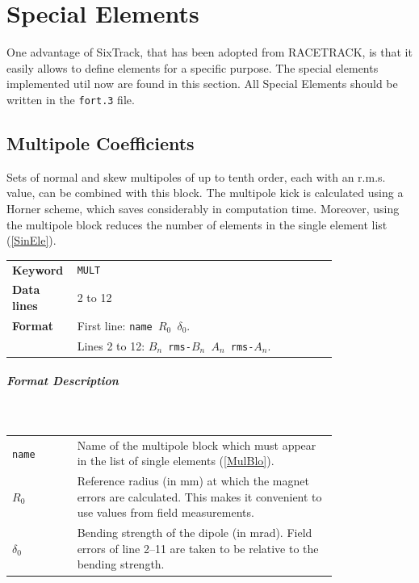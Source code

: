 
\chapter{Special Elements} \label{SpecElem}

One advantage of SixTrack, that has been adopted from RACETRACK, is that it easily allows to define elements for a specific purpose.
The special elements implemented util now are found in this section.
All Special Elements should be written in the \texttt{fort.3} file.

\section{Multipole Coefficients} \label{MulCoe}

Sets of normal and skew multipoles of up to tenth order, each with an r.m.s. value, can be combined with this block.
The multipole kick is calculated using a Horner scheme, which saves considerably in computation time.
Moreover, using the multipole block reduces the number of elements in the single element list (\ref{SinEle}).

\bigskip
\begin{tabular}{@{}lp{0.8\linewidth}}
    \textbf{Keyword}    & \texttt{MULT} \\
    \textbf{Data lines} & 2 to 12 \\
    \textbf{Format}     & First line: \texttt{name $R_{0}$ $\delta_{0}$}. \\
                        & Lines 2 to 12: \texttt{$B_{n}$ rms-$B_{n}$ $A_{n}$ rms-$A_{n}$}.
\end{tabular}

\paragraph{Format Description}~

\bigskip
\begin{tabular}{@{}lp{0.8\linewidth}}
    \texttt{name}    & Name of the multipole block which must appear in the list of single elements (\ref{MulBlo}). \\
    \texttt{$R_{0}$} & Reference radius (in mm) at which the magnet errors are calculated. This makes it convenient to use values from field measurements. \\
    \texttt{$\delta_{0}$} & Bending strength of the dipole (in mrad). Field errors of line 2--11 are taken to be relative to the bending strength.
\end{tabular}

